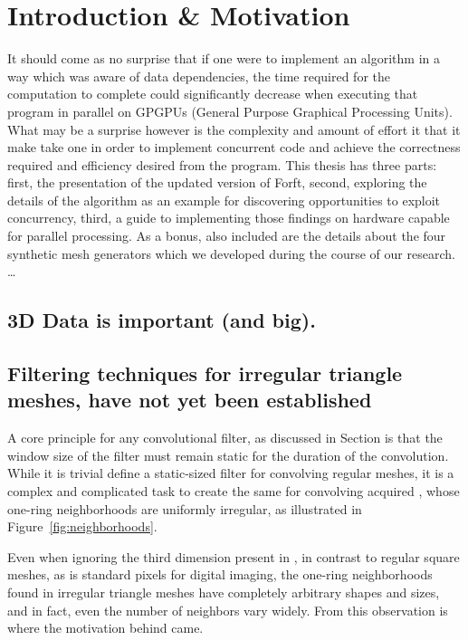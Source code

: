 \chapter{Introduction \& Motivation}
\label{ch1}
It should come as no surprise that if one were to implement an algorithm in a way which was aware of data dependencies, the time required for the computation to complete could significantly decrease when executing that program in parallel on GPGPUs (General Purpose Graphical Processing Units).  What may be a surprise however is the complexity and amount of effort it that it make take one in order to implement concurrent code and achieve the correctness required and efficiency desired from the program. This thesis has three parts: first, the presentation of the updated version of Forf{t}, second, exploring the details of the algorithm as an example for discovering opportunities to exploit concurrency, third, a guide to implementing those findings on hardware capable for parallel processing. As a bonus, also included are the details about the four synthetic mesh generators which we developed during the course of our research.
\ldots
{}

%
%
%
\section{3D Data is important (and big).}

\section{Filtering techniques for irregular triangle meshes, have not yet been established}



A core principle for any convolutional filter, as discussed in Section is that the  window size of the filter must remain static for the duration of the convolution. While it is trivial define a static-sized filter for convolving regular meshes, it is a complex and complicated task to create the same for convolving acquired \tdd{}, whose one-ring neighborhoods are uniformly irregular, as illustrated in Figure~\ref{fig:neighborhoods}.

Even when ignoring the third dimension present in \tdd{}, in contrast to regular square meshes, as is standard pixels for digital imaging, the one-ring neighborhoods found in irregular triangle meshes have completely arbitrary shapes and sizes, and in fact, even the number of neighbors vary widely. From this observation is where the motivation behind  came.
%
